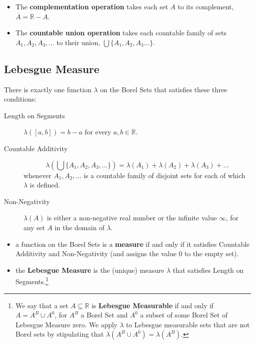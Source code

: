 \documentclass[12pt]{extarticle}
\begin{document}
\begin{itemize}
\item The \textbf{complementation operation} takes each set $A$ to its complement, $\overline{A}= \mathbb{R}-A$.


\item The \textbf{countable union operation} takes each countable family of sets $A_1, A_2, A_3, \ldots$ to their union, $\bigcup \{A_1, A_2 , A_3 \dots\}$.\label{gloss:count-un} 



\end{itemize}




\subsection{Lebesgue Measure}

There is exactly one function $\lambda$ on the Borel Sets that satisfies these three conditions:\label{gloss:leb-measurable}
\begin{description}
\item[Length on Segments] $\lambda([a,b]) = b-a$ for every $a,b \in \mathbb{R}$.\label{gloss:lls}



\item[Countable Additivity]
\[\lambda\left(\bigcup\{A_1,  A_2 , A_3,\ldots\}\right) = \lambda(A_1) + \lambda(A_2) + \lambda(A_3) + \ldots\] whenever $A_1,A_2,\dots$ is a countable family of disjoint sets for each of which $\lambda$ is defined.\label{gloss:count-add-measure}



\item[Non-Negativity]
$\lambda(A)$ is either a non-negative real number or the infinite value $\infty$, for any set $A$ in the domain of $\lambda$.\label{gloss:non-neg}



 \end{description}
 
 \begin{itemize}
 

\item a function on the Borel Sets is a \textbf{measure} if and only if it satisfies Countable Additivity and Non-Negativity (and assigns the value 0 to the empty set).\label{gloss:measure} 


 \item the \textbf{Lebesgue Measure} is the (unique) measure $\lambda$ that satisfies Length on Segments.\footnote{We say that a set  $A \subseteq \mathbb{R}$ is \textbf{Lebesgue Measurable} if and only if $A = A^B \cup A^0$, for $A^B$  a Borel Set and $A^0$ a subset of some Borel Set of Lebesgue Measure zero.  We apply $\lambda$ to Lebesgue measurable sets that are not Borel sets by stipulating that  $\lambda(A^B \cup A^0) = \lambda(A^B)$. }
 
 \end{itemize}
\end{document}
